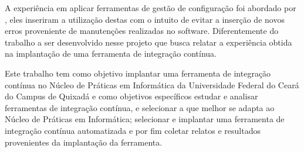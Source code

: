 A experiência em aplicar ferramentas de gestão de configuração foi abordado por , eles inseriram a utilização destas com o intuito de evitar a inserção de novos erros proveniente de manutenções realizadas no software. Diferentemente do trabalho a ser desenvolvido nesse projeto que busca relatar a experiência obtida na implantação de uma ferramenta de integração contínua.

Este trabalho tem como objetivo implantar uma ferramenta de integração contínua no Núcleo de Práticas em Informática da Universidade Federal do Ceará do Campus de Quixadá e como objetivos específicos estudar e analisar ferramentas de integração contínua, e selecionar a que melhor se adapta ao Núcleo de Práticas em Informática;
selecionar e implantar uma ferramenta de integração contínua automatizada e por fim coletar relatos e resultados provenientes da implantação da ferramenta.
